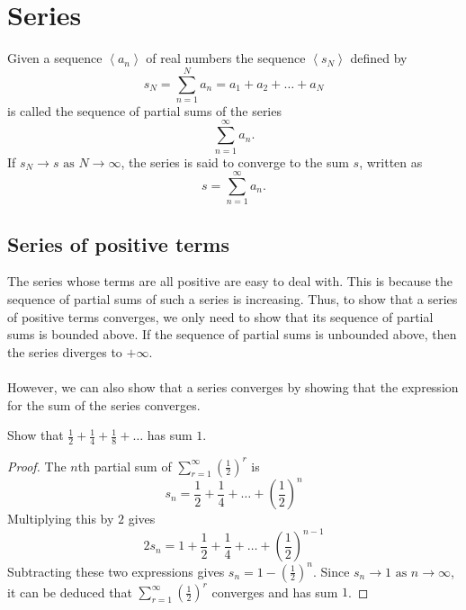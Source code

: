 \documentclass[10pt, a4paper]{article}
\newcommand{\limas}[3][n]{#2 \rightarrow #3 \text{ as } #1 \rightarrow \infty}
\newcommand{\sumfrto}[3][n = 1]{\sum_{#1}^{#2}{#3}} %
\newcommand{\sumto}[2][\infty]{\sumfrto{#1}{#2}}
\newcommand{\seq}[1][x_n]{\left\langle #1 \right\rangle}
\begin{document}
\newpage

\section{Series}
Given a sequence $\seq[a_n]$ of real numbers the sequence $\seq[s_N]$ defined by
\[
s_N = \sumto[N]{a_n} = a_1 + a_2 + \dots + a_N
\]
is called the sequence of partial sums of the series
\[
\sumto{a_n}.
\]
If $\limas[N]{s_N}{s}$, the series is said to converge to the sum $s$, written as
\[
s = \sumto{a_n}.
\]

\subsection{Series of positive terms}
The series whose terms are all positive are easy to deal with. This is because the sequence of partial sums of such a series is increasing. Thus, to show that a series of positive terms converges, we only need to show that its sequence of partial sums is bounded above. If the sequence of partial sums is unbounded above, then the series diverges to $+\infty$. \\
\\
However, we can also show that a series converges by showing that the expression for the sum of the series converges.
\begin{example}\label{examp_series_powtwoconv}
    Show that $\frac{1}{2} + \frac{1}{4} + \frac{1}{8} + \dotsc$ has sum $1$.
    \begin{proof}
        The $n$th partial sum of $\sum_{r = 1}^{\infty}{\left(\frac{1}{2}\right) ^ r}$ is
        \[
        s_n = \frac{1}{2} + \frac{1}{4} + \dotsc + \left(\frac{1}{2}\right) ^ n
        \]
        Multiplying this by $2$ gives
        \[
        2s_n = 1 + \frac{1}{2} + \frac{1}{4} + \dotsc + \left(\frac{1}{2}\right) ^ {n - 1}
        \]
        Subtracting these two expressions gives $s_n = 1 - \left(\frac{1}{2}\right) ^ n$. Since $\limas{s_n}{1}$, it can be deduced that $\sum_{r = 1}^{\infty}{\left(\frac{1}{2}\right) ^ r}$ converges and has sum $1$.
    \end{proof}
\end{example}
\end{document}
